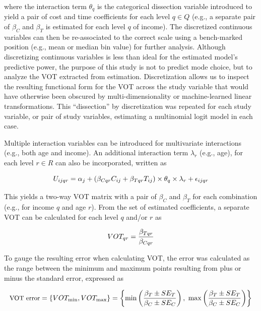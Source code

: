 \documentclass[numbered]{trbunofficial}\usepackage[]{graphicx}\usepackage[]{color}
\begin{document}
\noindent where the interaction term $\theta_q$ is the categorical dissection variable introduced to yield a pair of cost and time coefficients for each level $q \in Q$ (e.g., a separate pair of $\beta_C$ and $\beta_T$ is estimated for each level $q$ of income).  The discretized continuous variables can then be re-associated to the correct scale using a bench-marked position (e.g., mean or median bin value) for further analysis. Although discretizing continuous variables is less than ideal for the estimated model's predictive power, the purpose of this study is not to predict mode choice, but to analyze the VOT extracted from estimation. Discretization allows us to inspect the resulting functional form for the VOT across the study variable that would have otherwise been obscured by multi-dimensionality or machine-learned linear transformations. This ``dissection'' by discretization was repeated for each study variable, or pair of study variables, estimating a multinomial logit model in each case. 

Multiple interaction variables can be introduced for multivariate interactions (e.g., both age and income). An additional interaction term $\lambda_r$ (e.g., age), for each level $r \in R$ can also be incorporated, written as

\begin{equation}
  \label{eq:twointeract}
  \small
  U_{ijqr} = \alpha_{j} + \left( \beta_{Cqr} C_{ij} + \beta_{Tqr} T_{ij} \right) \times \theta_{q} \times \lambda_{r} + \epsilon_{ijqr}
\end{equation}

\noindent This yields a two-way VOT matrix with a pair of $\beta_C$ and $\beta_T$ for each combination (e.g., for income $q$ and age $r$). From the set of estimated coefficients, a separate VOT can be calculated for each level $q$ and/or $r$ as\vspace{3pt}

\begin{equation}
  \small
    VOT_{qr} = \frac{\beta_{Tqr}}{\beta_{Cqr}}
\end{equation}

To gauge the resulting error when calculating VOT, the error was calculated as the range between the minimum and maximum points resulting from plus or minus the standard error, expressed as
 
\begin{ceqn}
\begin{equation}\label{eq:error}
  \small
  \text{VOT error} = \left\{VOT_{\min}, VOT_{\max}\right\} = \left\{ \min \left(\frac{\beta_T \pm SE_T}{\beta_C \pm SE_C} \right),~ \max\left(\frac{\beta_T \pm SE_T}{\beta_C \pm SE_C} \right) \right\}
\end{equation}
\end{ceqn}
\end{document}

